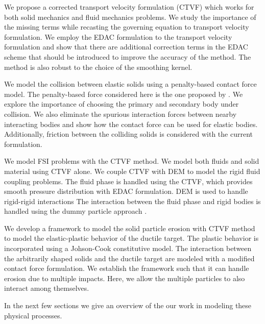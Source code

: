 We propose a corrected transport velocity formulation (CTVF) which works for both
solid mechanics and fluid mechanics problems. We study the importance of the
missing terms while recasting the governing equation to transport velocity
formulation. We employ the EDAC formulation to the transport velocity
formulation and show that there are additional correction terms in the EDAC
scheme that should be introduced to improve the accuracy of the method. The
method is also robust to the choice of the smoothing kernel.

We model the collision between elastic solids using a penalty-based contact
force model. The penalty-based force considered here is the one proposed by
\textcite{mohseni2021particle}. We explore the importance of choosing the
primary and secondary body under collision. We also eliminate the spurious
interaction forces between nearby interacting bodies and show how the contact
force can be used for elastic bodies. Additionally, friction between the
colliding solids is considered with the current formulation.

We model FSI problems with the CTVF method. We model both fluids and solid
material using CTVF alone. We couple CTVF with DEM to model the rigid fluid
coupling problems. The fluid phase is handled using the CTVF, which provides
smooth pressure distribution with EDAC formulation. DEM is used to handle
rigid-rigid interactions The interaction between the fluid phase and rigid
bodies is handled using the dummy particle approach \parencite{Adami2012}.

We develop a framework to model the solid particle erosion with CTVF method to
model the elastic-plastic behavior of the ductile target. The plastic
behavior is incorporated using a Johson-Cook constitutive model. The interaction
between the arbitrarily shaped solids and the ductile target are modeled with a
modified contact force formulation. We establish the framework such that it can
handle erosion due to multiple impacts. Here, we allow the multiple particles to
also interact among themselves.



In the next few sections we give an overview of the our work in modeling these
physical processes.
